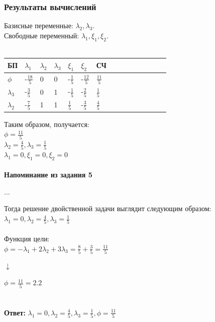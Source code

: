 \documentclass[14pt,a4paper,fleqn]{extarticle}
\begin{document}
	\subsubsection*{Результаты вычислений}
	Базисные переменные: $\lambda_2, \lambda_3$.\\
	Свободные переменный: $\lambda_1, \xi_1, \xi_2$.\\\\
	\begin{tabularx}{\textwidth}{V{1}p{1.7cm}V{1}p{1.7cm}V{1}p{1.7cm}V{1}p{1.7cm}V{1}p{1.7cm}V{1}p{1.7cm}V{1}p{1.85cm}V{1}}
		\hline
		БП & $\lambda_1$ & $\lambda_2$ & $\lambda_3$ & $\xi_1$ & $\xi_2$ & СЧ\\
		\hline
		$\phi$ & \small -$\frac{18}{5}$ & 0 & 0 & \small -$\frac{1}{5}$ & \small -$\frac{12}{5}$ & \small $\frac{11}{5}$\\
		\hline
		$\lambda_3$ & \small -$\frac{3}{5}$ & 0 & 1 & \small -$\frac{1}{5}$ & \small -$\frac{2}{5}$ & \small $\frac{1}{5}$\\
		\hline
		$\lambda_2$ & \small -$\frac{7}{5}$ & 1 & 1 & \small $\frac{1}{5}$ & \small -$\frac{3}{5}$ & \small $\frac{4}{5}$\\
		\hline
	\end{tabularx}
	\newline\newline
	Таким образом, получается:\\
	$\phi = \frac{11}{5}$\\
	$\lambda_2 = \frac{4}{5}, \lambda_3 = \frac{1}{5}$\\
	$\lambda_1 = 0, \xi_1 = 0, \xi_2 = 0$\\
	\noindent\makebox[\linewidth]{\rule{\paperwidth}{0.4pt}}\\
	\textbf{Напоминание из задания 5}
	\begin{center}
		...
	\end{center}
	Тогда решение двойственной задачи выглядит следующим образом:\\
	$\lambda_1 = 0, \lambda_2 = \frac{4}{5}, \lambda_3 = \frac{1}{5}$\\\\
	Функция цели:\\
	$\phi = -\lambda_1 + 2\lambda_2 + 3\lambda_3 = \frac{8}{5} + \frac{3}{5} = \frac{11}{5}$
	\begin{center}$\downarrow$\end{center}
	$\phi = \frac{11}{5} = 2.2$\\
	\noindent\makebox[\linewidth]{\rule{\paperwidth}{0.4pt}}\\\\
	\textbf{Ответ:} $\lambda_1 = 0, \lambda_2 = \frac{4}{5}, \lambda_3 = \frac{1}{5}, \phi = \frac{11}{5}$
\end{document}
